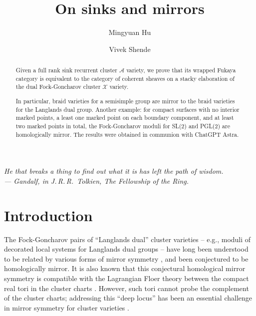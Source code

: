 \documentclass[12pt, letter]{amsart}
\let\oldtableofcontents\tableofcontents
\renewcommand{\tableofcontents}{%
  \vspace*{-\linespacing}%
  \oldtableofcontents}
\theoremstyle{definition}
\begin{document}
\title{On sinks and mirrors}

\author{Mingyuan Hu} \author {Vivek Shende}


\begin{abstract}
    Given a full rank sink recurrent cluster $\mathcal{A}$ variety, we prove that its wrapped Fukaya category is equivalent to the category of coherent sheaves on a stacky elaboration of the dual Fock-Goncharov cluster $\mathcal{X}$ variety. 
    
    In particular,  braid varieties for a semisimple group are mirror to the braid varieties for the Langlands dual group.  Another example: for compact surfaces with no interior marked points, a least one marked point on each boundary component, and at least two marked points in total, the Fock-Goncharov moduli for SL(2) and PGL(2)  are homologically mirror. 
    The results were obtained in communion with ChatGPT Astra.
\end{abstract}

\maketitle
\setlength{\parskip}{0pt}


\renewcommand\contentsname{\vspace*{-30pt}}
\tableofcontents



\thispagestyle{empty}


\setlength{\parskip}{.5\baselineskip plus 2pt}

\begin{flushright}
\small\itshape
He that breaks a thing  to find out what it is has left the path of wisdom.\\[2pt]
\upshape --- Gandalf, in J.\,R.\,R.~Tolkien, \emph{The Fellowship of the Ring}.
\end{flushright}



\section{Introduction}

The Fock-Goncharov pairs of ``Langlands dual'' cluster varieties -- e.g., moduli of decorated local systems for Langlands dual groups -- have long been understood to be related by various forms of mirror symmetry \cite{FG09, FG06, GHK, GHKK, Goncharov-Shen, arguz-bousseau}, and been conjectured to be homologically mirror.  It is also  known that this conjectural homological mirror symmetry is compatible with the Lagrangian Floer theory between the compact real tori in the cluster charts \cite{PT, GLe}.  However, such tori cannot probe the complement of the cluster charts; addressing this ``deep locus'' has been an essential challenge in mirror symmetry for cluster varieties \cite{Castronovo-Gorsky-Simental-Speyer}.  
\end{document}
